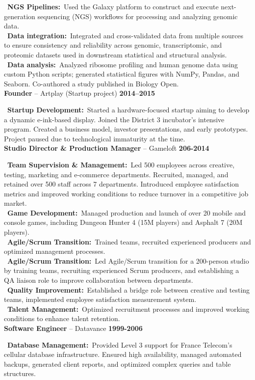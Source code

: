 \documentclass[a4paper,10pt]{article}
\newcommand{\resumeItem}[3]{%
  \noindent\textbf{#1} -- #2 \hfill \textbf{#3} \\
  \vspace{0.3em}
}
\newcommand{\jobItem}[2]{%
  \noindent
  \textbullet\ \textbf{#1\ifthenelse{\boolean{EN}}{}{ }:}~#2\vspace{0.3em} \\
}
\begin{document}
{{    \jobItem{NGS Pipelines}{Used the Galaxy platform to construct and execute next-generation sequencing (NGS) workflows for processing and analyzing genomic data.}
    \jobItem{Data integration}{Integrated and cross-validated data from multiple sources to ensure consistency and reliability across genomic, transcriptomic, and proteomic datasets used in downstream statistical and structural analysis.}
    \jobItem{Data analysis}{Analyzed ribosome profiling and human genome data using custom Python scripts; generated statistical figures with NumPy, Pandas, and Seaborn. Co-authored a study published in Biology Open.}
    \vspace{1em}
    \resumeItem{Founder}{Artplay (Startup project)}{2014–2015}
    \jobItem{Startup Development}{Started a hardware-focused startup aiming to develop a dynamic e-ink-based display. Joined the District 3 incubator’s intensive program. Created a business model, investor presentations, and early prototypes. Project paused due to technological immaturity at the time.}
    \vspace{1em}
    \resumeItem{Studio Director \& Production Manager}{Gameloft}{206-2014}
    \jobItem{Team Supervision \& Management}{Led 500 employees across creative, testing, marketing and e-commerce departments. Recruited, managed, and retained over 500 staff across 7 departments. Introduced employee satisfaction metrics and improved working conditions to reduce turnover in a competitive job market.}
    \jobItem{Game Development}{Managed production and launch of over 20 mobile and console games, including Dungeon Hunter 4 (15M players) and Asphalt 7 (20M players).}
    \jobItem{Agile/Scrum Transition}{Trained teams, recruited experienced producers and optimized management processes.}
    \jobItem{Agile/Scrum Transition}{Led Agile/Scrum transition for a 200-person studio by training teams, recruiting experienced Scrum producers, and establishing a QA liaison role to improve collaboration between departments.}
    \jobItem{Quality Improvement}{Established a bridge role between creative and testing teams, implemented employee satisfaction measurement system.}
    \jobItem{Talent Management}{Optimized recruitment processes and improved working conditions to enhance talent retention.}
    \vspace{1em}
    \resumeItem{Software Engineer}{Datavance}{1999-2006}
    \jobItem{Database Management}{Provided Level 3 support for France Telecom's cellular database infrastructure. Ensured high availability, managed automated backups, generated client reports, and optimized complex queries and table structures.}
}}
\end{document}

